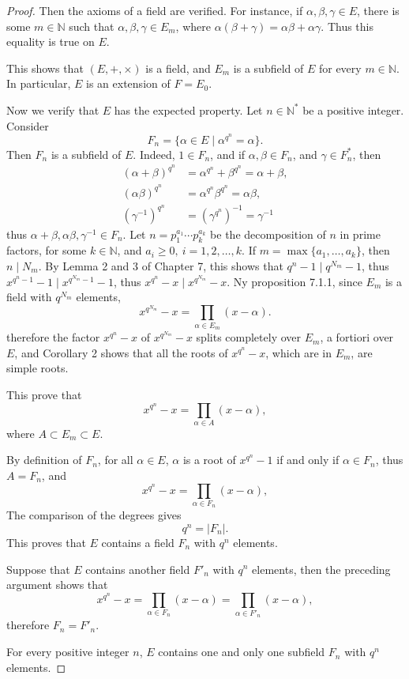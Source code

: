 \documentclass[11pt,a4paper]{article}
\newcommand{\N}{\mathbb{N}}
\begin{document}
\begin{proof}
Then the axioms of a field are verified. For instance, if $\alpha, \beta, \gamma \in E$, there is some $m\in \N$ such that $\alpha, \beta,\gamma \in E_m$, where $\alpha(\beta + \gamma) = \alpha \beta + \alpha \gamma$. Thus this equality is true on $E$.

This shows that $(E,+,\times)$ is a field, and $E_m$ is a subfield of $E$ for every $m\in \N$. In particular, $E$ is an extension of $F = E_0$.

Now we verify that $E$ has the expected property. Let $n \in \N^*$ be a positive integer. Consider
$$F_n = \{\alpha \in E \mid \alpha^{q^n} = \alpha\}.$$
Then $F_n$ is a subfield of $E$. Indeed, $1 \in F_n$, and if $\alpha, \beta \in F_n$, and $\gamma \in F_n^*$, then
\begin{align*}
(\alpha + \beta)^{q^n} &= \alpha^{q^n} + \beta^{q^n} = \alpha + \beta,\\
(\alpha  \beta)^{q^n} &= \alpha^{q^n}  \beta^{q^n} = \alpha  \beta,\\
(\gamma^{-1})^{q^n} &=( \gamma^{q^n})^{-1} = \gamma^{-1}
\end{align*}
thus $\alpha + \beta, \alpha \beta, \gamma^{-1} \in F_n$.        
Let $n = p_1^{a_1}\cdots p_k^{a_k}$ be the decomposition of $n$ in prime factors, for some $k\in \N$,  and $a_i \geq 0, \ i= 1,2,\ldots,k$. If $m = \max \{a_1,\ldots,a_k\}$, then $n \mid N_m$. By Lemma 2 and 3 of Chapter 7,  this shows that $q^n - 1 \mid q^{N_m} - 1$, thus $x^{q^n - 1} - 1 \mid x^{q^{N_m} - 1} - 1$, thus $x^{q^n} - x \mid x^{q^{N_m}} - x$. Ny proposition 7.1.1, since $E_m$ is a field with $q^{N_m}$ elements,
$$x^{q^{N_m}} - x =\prod_{\alpha \in E_m} (x- \alpha).$$
therefore the factor $x^{q^n} - x$ of $x^{q^{N_m}} - x$ splits completely over $E_m$, a fortiori over $E$, and Corollary 2 shows that all the roots of $x^{q^n} - x$, which are in $E_m$, are simple roots.

This prove that
$$ x^{q^n} -  x =\prod_{\alpha \in A} (x- \alpha),$$
where $A \subset E_m \subset E$.

By definition of $F_n$, for all $\alpha \in E$, $\alpha$ is a root of $x^{q^n}- 1$ if and only if $\alpha \in F_n$, thus $A = F_n$, and
$$ x^{q^n} -  x =\prod_{\alpha \in F_n} (x- \alpha),$$
The comparison of the degrees gives
$$q^n = |F_n|.$$
This proves that $E$ contains a field $F_n$ with $q^n$ elements.

Suppose that $E$ contains another field $F'_n$ with $q^n$ elements, then the preceding argument shows that
$$x^{q^n} - x =\prod_{\alpha \in F_n} (x - \alpha) =\prod_{\alpha \in F'_n} (x - \alpha),$$
therefore $F_n = F'_n$.

For every positive integer $n$, $E$ contains one and only one subfield $F_n$ with $q^n$ elements.
\end{proof}
\end{document}
